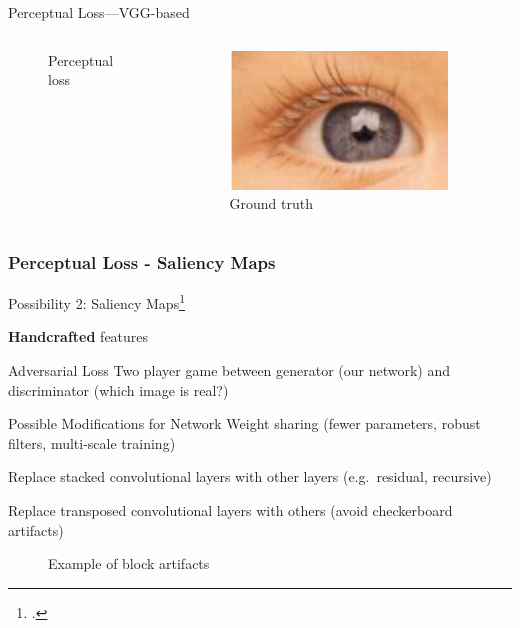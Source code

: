 \documentclass{beamer}
\begin{document}
\begin{frame}{Perceptual Loss---VGG-based}
\begin{columns}
\begin{column}{0.33\linewidth}
\begin{figure}[h]
      \caption*{Perceptual loss}
    \end{figure}
  \end{column}  \begin{column}{0.33\linewidth}
    \begin{figure}[h]
      \centering
        \includegraphics[width=0.9\textwidth]{perceptual_loss_gt}
      \caption*{Ground truth}
    \end{figure}
  \end{column}
\end{columns}
\end{frame}

\begin{frame}
  \frametitle{Perceptual Loss - Saliency Maps}
   Possibility 2: Saliency Maps\footcite{SaliencyGAN}

  \textbf{Handcrafted} features
\end{frame}

\begin{frame}{Adversarial Loss}
Two player game between generator (our network) and discriminator (which image is real?)
\end{frame}

\begin{frame}{Possible Modifications for Network}
  Weight sharing (fewer parameters, robust filters, multi-scale training)

  Replace stacked convolutional layers with other layers (e.g.\ residual, recursive)

  Replace transposed convolutional layers with others (avoid checkerboard artifacts)

  \begin{figure}[h]
    \centering
    \caption{Example of block artifacts}
    \label{fig:lap-srn}
  \end{figure}
\end{frame}
\end{document}
